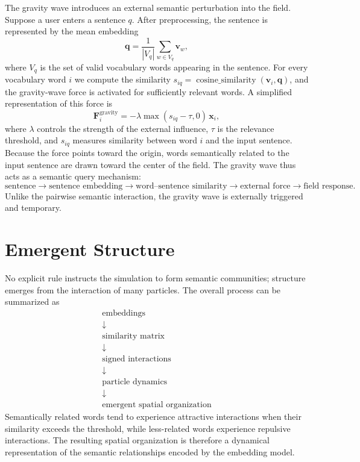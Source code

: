 \documentclass[11pt]{amsart}
\begin{document}
The gravity wave introduces an external semantic perturbation into the field.
Suppose a user enters a sentence $q$. After preprocessing, the sentence is
represented by the mean embedding
\[
\mathbf{q}
=
\frac{1}{|V_q|} \sum_{w \in V_q} \mathbf{v}_w,
\]
where $V_q$ is the set of valid vocabulary words appearing in the sentence. For
every vocabulary word $i$ we compute the similarity
$s_{iq} = \operatorname{cosine\_similarity}(\mathbf{v}_i, \mathbf{q})$, and the
gravity-wave force is activated for sufficiently relevant words. A simplified
representation of this force is
\begin{equation}
\label{eq:gravity}
\mathbf{F}_i^{\mathrm{gravity}}
=
-\lambda \max(s_{iq} - \tau, 0)\, \mathbf{x}_i,
\end{equation}
where $\lambda$ controls the strength of the external influence, $\tau$ is the
relevance threshold, and $s_{iq}$ measures similarity between word $i$ and the
input sentence. Because the force points toward the origin, words semantically
related to the input sentence are drawn toward the center of the field. The
gravity wave thus acts as a semantic query mechanism:
\[
\text{sentence} \rightarrow \text{sentence embedding}
\rightarrow \text{word--sentence similarity}
\rightarrow \text{external force}
\rightarrow \text{field response}.
\]
Unlike the pairwise semantic interaction, the gravity wave is externally
triggered and temporary.

\section{Emergent Structure}

No explicit rule instructs the simulation to form semantic communities;
structure emerges from the interaction of many particles. The overall process
can be summarized as
\[
\begin{gathered}
\text{embeddings}\\
\downarrow\\
\text{similarity matrix}\\
\downarrow\\
\text{signed interactions}\\
\downarrow\\
\text{particle dynamics}\\
\downarrow\\
\text{emergent spatial organization}
\end{gathered}
\]
Semantically related words tend to experience attractive interactions when
their similarity exceeds the threshold, while less-related words experience
repulsive interactions. The resulting spatial organization is therefore a
dynamical representation of the semantic relationships encoded by the embedding
model.
\end{document}
